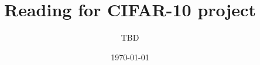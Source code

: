 \documentclass[letterpaper,11pt,reqno]{amsart}
\begin{document}
\author{TBD}
\title{Reading for CIFAR-10 project}
\date{\today}
\maketitle

\nocite{*}


\end{document}
